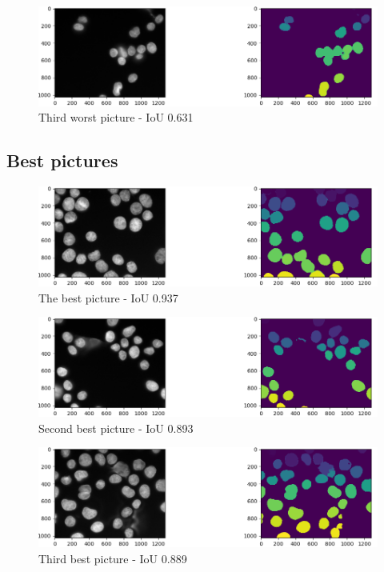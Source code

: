 \documentclass{article}
\begin{document}
\begin{figure}[H]
\centering
\includegraphics[width=\textwidth]{figures/3_worst.png}
\caption{Third worst picture - IoU 0.631}
\end{figure}



\subsection{Best pictures}
\begin{figure}[H]
\centering
\includegraphics[width=\textwidth]{figures/1_best.png}
\caption{The best picture - IoU 0.937}
\end{figure}

\begin{figure}[H]
\centering
\includegraphics[width=\textwidth]{figures/2_best.png}
\caption{Second best picture - IoU 0.893}
\end{figure}


\begin{figure}[H]
\centering
\includegraphics[width=\textwidth]{figures/3_best.png}
\caption{Third best picture - IoU 0.889}
\end{figure}
\end{document}
